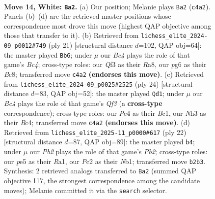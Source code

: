 \documentclass[11pt]{article}
\begin{document}
\clearpage

\begin{figure}[p]\centering
\begin{subfigure}{0.46\textwidth}\centering
\resizebox{\linewidth}{!}{%
\newchessgame
\chessboard[
  setfen={r1bq1rk1/2p1bp1p/p2p1np1/n3p3/PpB1P3/3P1Q1N/1PP2PPP/RNB1R1K1 w - - 2 14},
  showmover=false,
  pgfstyle=straightmove, color=movearrow, markmove={c4-a2}
]}
\caption{}
\end{subfigure}\hfill
\begin{subfigure}{0.46\textwidth}\centering
\resizebox{\linewidth}{!}{%
\newchessgame
\chessboard[
  setfen={r1bq1rk1/pp3ppp/2pp1n2/2b1p3/1PP1P3/P1NP1B2/5PPP/1RBQ1RK1 b - - 0 11},
  showmover=false,
  pgfstyle=straightmove, color=movearrow, markmove={c5-b6}
]}
\caption{}
\end{subfigure}
\\[4pt]
\begin{subfigure}{0.46\textwidth}\centering
\resizebox{\linewidth}{!}{%
\newchessgame
\chessboard[
  setfen={1rbq1rk1/ppp1bpp1/3p3p/P2Np3/2BnP3/3P1Q1P/1PP2PP1/R1B1R1K1 w - - 1 13},
  showmover=false,
  pgfstyle=straightmove, color=movearrow, markmove={f3-d1}
]}
\caption{}
\end{subfigure}\hfill
\begin{subfigure}{0.46\textwidth}\centering
\resizebox{\linewidth}{!}{%
\newchessgame
\chessboard[
  setfen={r1bq1rk1/1pp2p2/p1np3p/2b1p2n/P1B1P1pN/2PP2B1/1P3PPP/RN1Q1RK1 w - - 2 12},
  showmover=false,
  pgfstyle=straightmove, color=movearrow, markmove={b2-b4}
]}
\caption{}
\end{subfigure}
\caption{\textbf{Move 14, White: \texttt{Ba2}.} (a) Our position; Melanie plays \texttt{Ba2} (\texttt{c4a2}). Panels (b)--(d) are the retrieved master positions whose correspondence most drove this move (highest QAP objective among those that transfer to it). (b) Retrieved from \texttt{lichess\_elite\_2024-09\_p0012\#749} (ply 21) [structural distance $d$=102, QAP obj=64]: the master played \texttt{Bb6}; under $\mu$ our \emph{Bc4} plays the role of that game's \emph{Bc4}; cross-type roles: our \emph{Q}f3 as their \emph{R}a8, our \emph{p}g6 as their \emph{B}c8; transferred move \texttt{c4a2} \textbf{(endorses this move)}. (c) Retrieved from \texttt{lichess\_elite\_2024-09\_p0025\#2525} (ply 24) [structural distance $d$=83, QAP obj=52]: the master played \texttt{Qd1}; under $\mu$ our \emph{Bc4} plays the role of that game's \emph{Qf3} (a \textbf{cross-type} correspondence); cross-type roles: our \emph{P}e4 as their \emph{B}c1, our \emph{N}h3 as their \emph{B}c4; transferred move \texttt{c4a2} \textbf{(endorses this move)}. (d) Retrieved from \texttt{lichess\_elite\_2025-11\_p0000\#617} (ply 22) [structural distance $d$=87, QAP obj=89]: the master played \texttt{b4}; under $\mu$ our \emph{Pb2} plays the role of that game's \emph{Pb2}; cross-type roles: our \emph{p}e5 as their \emph{R}a1, our \emph{P}c2 as their \emph{N}b1; transferred move \texttt{b2b3}. Synthesis: 2 retrieved analogs transferred to \texttt{Ba2} (summed QAP objective 117, the strongest correspondence among the candidate moves); Melanie committed it via the \texttt{search} selector.}
\label{fig:thought-m26}
\end{figure}
\end{document}
